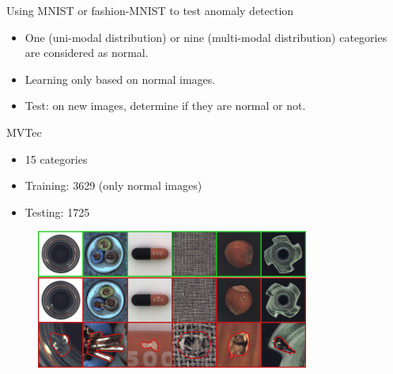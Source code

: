 \documentclass[xcolor=pdftex,dvipsnames,table,mathserif]{beamer}
\begin{document}
\begin{frame}{Using MNIST or fashion-MNIST to test anomaly detection}

\begin{itemize}
\item One (uni-modal distribution) or nine (multi-modal distribution) categories are considered as normal.
\item Learning only based on normal images.
\item Test: on new images, determine if they are normal or not.
\end{itemize}

\end{frame}



\begin{frame}{MVTec~\tiny{\cite{bergmann_mvtec_2019}}}

\begin{itemize}
\item 15 categories
\item Training: 3629 (only normal images)
\item Testing: 1725
\end{itemize}

\begin{figure}[ht]
  \centering
  \includegraphics[width=0.8\textwidth]{mvtec}
\end{figure}


\end{frame}
\end{document}
